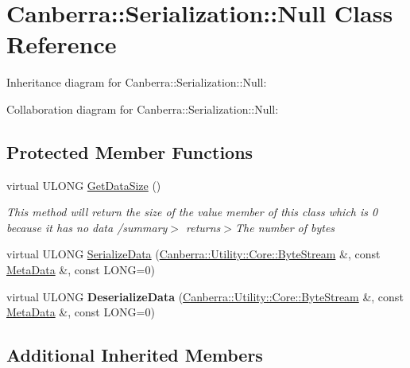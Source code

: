 \hypertarget{class_canberra_1_1_serialization_1_1_null}{}\section{Canberra\+:\+:Serialization\+:\+:Null Class Reference}
\label{class_canberra_1_1_serialization_1_1_null}


Inheritance diagram for Canberra\+:\+:Serialization\+:\+:Null\+:


Collaboration diagram for Canberra\+:\+:Serialization\+:\+:Null\+:
\subsection*{Protected Member Functions}
\begin{DoxyCompactItemize}
\item 
virtual U\+L\+O\+NG \hyperlink{class_canberra_1_1_serialization_1_1_null_ac1e04c89451e4e7aabdf791715218c6e_ac1e04c89451e4e7aabdf791715218c6e}{Get\+Data\+Size} ()
\begin{DoxyCompactList}\small\item\em This method will return the size of the value member of this class which is 0 because it has no data /summary$>$ returns$>$The number of bytes\end{DoxyCompactList}\item 
virtual U\+L\+O\+NG \hyperlink{class_canberra_1_1_serialization_1_1_null_a04a4447561d41d4fee429eea43badc4f_a04a4447561d41d4fee429eea43badc4f}{Serialize\+Data} (\hyperlink{class_canberra_1_1_utility_1_1_core_1_1_byte_stream}{Canberra\+::\+Utility\+::\+Core\+::\+Byte\+Stream} \&, const \hyperlink{class_canberra_1_1_serialization_1_1_meta_data}{Meta\+Data} \&, const L\+O\+NG=0)
\item 
\mbox{\label{class_canberra_1_1_serialization_1_1_null_a72f57a62f7fe356849243405df204d87}} 
virtual U\+L\+O\+NG {\bfseries Deserialize\+Data} (\hyperlink{class_canberra_1_1_utility_1_1_core_1_1_byte_stream}{Canberra\+::\+Utility\+::\+Core\+::\+Byte\+Stream} \&, const \hyperlink{class_canberra_1_1_serialization_1_1_meta_data}{Meta\+Data} \&, const L\+O\+NG=0)
\end{DoxyCompactItemize}
\subsection*{Additional Inherited Members}


